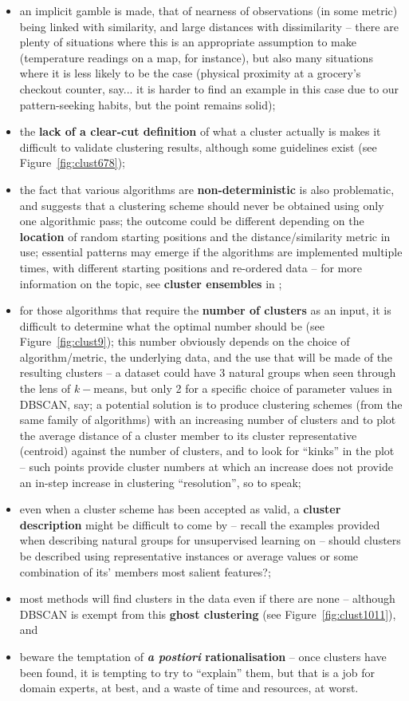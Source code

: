 \begin{itemize}[noitemsep]
\item an implicit gamble is made, that of nearness of observations (in some metric) being linked with similarity, and large distances with dissimilarity -- there are plenty of situations where this is an appropriate assumption to make (temperature readings on a map, for instance), but also many situations where it is less likely to be the case (physical proximity at a grocery's checkout counter, say... it is harder to find an example in this case due to our pattern-seeking habits, but the point remains solid);  
\item the \textbf{lack of a clear-cut definition} of what a cluster actually is makes it difficult to validate clustering results, although some guidelines exist (see Figure~\ref{fig:clust678});
\item the fact that various algorithms are \textbf{non-deterministic} is also problematic, and suggests that a clustering scheme should never be obtained using only one algorithmic pass; the outcome could be different depending on the \textbf{location} of random starting positions and the distance/similarity metric in use; essential patterns may emerge if the algorithms are implemented multiple times, with different starting positions and re-ordered data -- for more information on the topic, see \textbf{cluster ensembles} in \cite{DSML_CL1};
\item for those algorithms that require the \textbf{number of clusters} as an input, it is difficult to determine what the optimal number should be (see Figure~\ref{fig:clust9}); this number obviously depends on the choice of algorithm/metric, the underlying data, and the use that will be made of the resulting clusters -- a dataset could have 3 natural groups when seen through the lens of $k-$means, but only 2 for a specific choice of parameter values in DBSCAN, say; a potential solution is to produce clustering schemes (from the same family of algorithms) with an increasing number of clusters and to plot the average distance of a cluster member to its cluster representative (centroid) against the number of clusters, and to look for ``kinks'' in the plot -- such points provide cluster numbers at which an increase does not provide an in-step increase in clustering ``resolution'', so to speak; 
\item even when a cluster scheme has been accepted as valid, a \textbf{cluster description} might be difficult to come by -- recall the examples provided when describing natural groups for unsupervised learning on \pageref{unsl} -- should clusters be described using representative instances or average values or some combination of its' members most salient features?;
\item most methods will find clusters in the data even if there are none -- although DBSCAN is exempt from this \textbf{ghost clustering} (see Figure~\ref{fig:clust1011}), and 
\item beware the temptation of \textbf{\textit{a postiori} rationalisation} -- once clusters have been found, it is tempting to try to ``explain'' them, but that is a job for domain experts, at best, and a waste of time and resources, at worst. 
\end{itemize}

